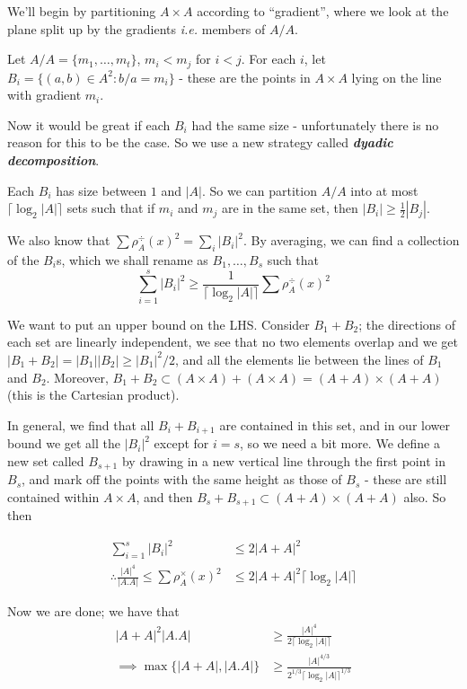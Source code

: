 \documentclass[]{article}
\theoremstyle{custhm}
\theoremstyle{cusdef}
\theoremstyle{custhm}
\theoremstyle{custhm}
\theoremstyle{custhm}
\theoremstyle{custhm}
\theoremstyle{cusdef}
\theoremstyle{remark}
\theoremstyle{custhm}
\newcommand{\undf}[1]{\textit{\textbf{#1}}}
\renewcommand{\it}[1]{\textit{#1}}
\begin{document}
We'll begin by partitioning $A\times A$ according to ``gradient'', where we look at the plane split up by the gradients \it{i.e.} members of $A/A$.

Let $A/A = \{m_1,\dots,m_t\}$, $m_i < m_j$ for $i < j$. For each $i$, let $B_i = \{(a,b)\in A^2 : b/a = m_i\}$ - these are the points in $A\times A$ lying on the line with gradient $m_i$.

Now it would be great if each $B_i$ had the same size - unfortunately there is no reason for this to be the case. So we use a new strategy called \undf{dyadic decomposition}.

Each $B_i$ has size between $1$ and $|A|$. So we can partition $A/A$ into at most $\lceil \log_2|A|\rceil$ sets such that if $m_i$ and $m_j$ are in the same set, then $|B_i| \ge \frac{1}{2}|B_j|$.

We also know that $\sum\rho_A^\div (x)^2 = \sum_{i}|B_i|^2$. By averaging, we can find a collection of the $B_i$s, which we shall rename as $B_1,\dots,B_s$ such that $$\sum_{i=1}^{s}|B_i|^2 \ge \frac{1}{\lceil\log_2|A|\rceil}\sum\rho_A^\div(x)^2$$

We want to put an upper bound on the LHS. Consider $B_1 + B_2$; the directions of each set are linearly independent, we see that no two elements overlap and we get $|B_1+B_2| = |B_1||B_2|\ge |B_1|^2/2$, and all the elements lie between the lines of $B_1$ and $B_2$. Moreover, $B_1+B_2\subset (A\times A) + (A\times A) = (A+A)\times (A+A)$ (this is the Cartesian product).

In general, we find that all $B_i + B_{i+1}$ are contained in this set, and in our lower bound we get all the $|B_i|^2$ except for $i = s$, so we need a bit more. We define a new set called $B_{s+1}$ by drawing in a new vertical line through the first point in $B_s$, and mark off the points with the same height as those of $B_s$ - these are still contained within $A\times A$, and then $B_s + B_{s+1} \subset (A+A)\times(A+A)$ also. So then

\begin{align*}
\sum_{i=1}^{s}|B_i|^2 &\le 2|A + A|^2\\
\therefore \frac{|A|^4}{|A.A|} \le \sum\rho_A^\times(x)^2 &\le 2|A+A|^2 \lceil\log_2|A|\rceil
\end{align*}

Now we are done; we have that
\begin{align*}
	|A+A|^2|A.A| &\ge \frac{|A|^4}{2\lceil\log_2|A|\rceil}\\
	\implies \max\{|A+A|,|A.A|\}&\ge \frac{|A|^{4/3}}{2^{1/3}\lceil\log_2|A|\rceil^{1/3}}
\end{align*}
\end{document}
